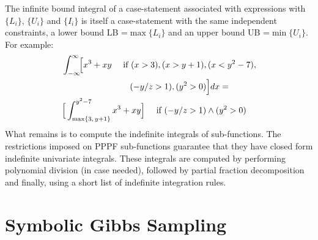 \documentclass{article}
\newcommand{\singlecase}[2]{#2 \quad \text{ if } #1}
\begin{document}
The infinite bound integral of a case-statement 
associated with expressions with $\{L_i\}$, $\{U_i\}$ and $\{I_i\}$ 
is itself a case-statement with the same independent constraints,
a lower bound LB =$\max\{L_i\}$ and 
an upper bound UB =$ \min\{U_i\}$.
For example:
{\footnotesize 
\begin{align*}
&\int_{-\infty}^{\infty}\!\! \Big[
\singlecase{(x>3), (x>y+1), (x<y^2-7), \\
&\hspace{28mm} (-y/z > 1) , (y^2>0)}
{x^3 + xy} \Big] dx = \\
&\singlecase{(-y/z > 1) \wedge (y^2>0)}
{\Big[ \int_{\max\{3, \, y+1\}}^{y^2 - 7}x^3 + xy \Big]} 
\end{align*}  
}
What remains is to compute the indefinite integrals of sub-functions. 
The restrictions imposed on PPPF sub-functions 
guarantee that they have closed form indefinite univariate integrals.
These integrals are computed by performing polynomial division (in case needed),
followed by partial fraction decomposition and finally, using a short list of indefinite integration rules.

\section{Symbolic Gibbs Sampling}
\label{sect:symbolic.gibbs}


\end{document}
